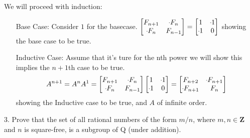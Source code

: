 \begin{mdframed}[style=darkAnswer,frametitle={Joe Starr}]
We will proceed with induction:
\begin{itemize}[align=left]
\item[Base Case:]{ Consider $1$ for the basecase.
    $\begin{bmatrix}F_{n+1} & \m F_{n} \\
      \m F_{n} & F_{n-1} \\
      \end{bmatrix}=\begin{bmatrix}1 & \m 1 \\
      \m 1 & 0 \\
      \end{bmatrix}$ showing the base case to be true.
  }
\item[Inductive Case:]{ Assume that it's ture for the nth power we will show
    this implies the $n+1$th case to be true.
    $$A^{n+1}=A^nA^1=\begin{bmatrix}F_{n+1} & \m F_{n} \\
      \m F_{n} & F_{n-1} \\
      \end{bmatrix}\begin{bmatrix}1 & \m 1 \\
      \m 1 & 0 \\
      \end{bmatrix}=\begin{bmatrix}F_{n+2} & \m F_{n+1} \\
      \m F_{n+1} & F_{n} \\
      \end{bmatrix}$$ showing the Inductive case to be true, and $A$ of infinite
    order.
  }
\end{itemize}
\end{mdframed}
\newpage
\begin{mdframed}[style=darkQuesion]
3. Prove that the set of all rational numbers of the form $m / n$, where $m, n \in \mathbf{Z}$ and $n$ is square-free, is a subgroup of Q (under addition).

\end{mdframed}

